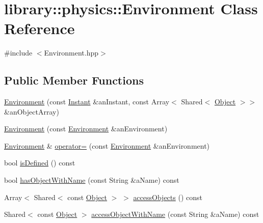\hypertarget{classlibrary_1_1physics_1_1_environment}{}\section{library\+:\+:physics\+:\+:Environment Class Reference}
\label{classlibrary_1_1physics_1_1_environment}


{\ttfamily \#include $<$Environment.\+hpp$>$}

\subsection*{Public Member Functions}
\begin{DoxyCompactItemize}
\item 
\hyperlink{classlibrary_1_1physics_1_1_environment_a51854f130c31eb075ea623e332978495}{Environment} (const \hyperlink{classlibrary_1_1physics_1_1time_1_1_instant}{Instant} \&an\+Instant, const Array$<$ Shared$<$ \hyperlink{classlibrary_1_1physics_1_1env_1_1_object}{Object} $>$$>$ \&an\+Object\+Array)
\item 
\hyperlink{classlibrary_1_1physics_1_1_environment_afb2fe03dcd7061a8ed5e155d7d134ba2}{Environment} (const \hyperlink{classlibrary_1_1physics_1_1_environment}{Environment} \&an\+Environment)
\item 
\hyperlink{classlibrary_1_1physics_1_1_environment}{Environment} \& \hyperlink{classlibrary_1_1physics_1_1_environment_a3410b331642161ad087d76b7d5019a86}{operator=} (const \hyperlink{classlibrary_1_1physics_1_1_environment}{Environment} \&an\+Environment)
\item 
bool \hyperlink{classlibrary_1_1physics_1_1_environment_acbe2e199328ec6a3d2c233dbe8eb6359}{is\+Defined} () const
\item 
bool \hyperlink{classlibrary_1_1physics_1_1_environment_ab88060948d60e3775d3c48047e1565aa}{has\+Object\+With\+Name} (const String \&a\+Name) const
\item 
Array$<$ Shared$<$ const \hyperlink{classlibrary_1_1physics_1_1env_1_1_object}{Object} $>$ $>$ \hyperlink{classlibrary_1_1physics_1_1_environment_a109b7156dadfe992126e01c629146a75}{access\+Objects} () const
\item 
Shared$<$ const \hyperlink{classlibrary_1_1physics_1_1env_1_1_object}{Object} $>$ \hyperlink{classlibrary_1_1physics_1_1_environment_adb18bd17dfbffa181d7e0d868c2647a0}{access\+Object\+With\+Name} (const String \&a\+Name) const
\item 
$$
\end{DoxyCompactItemize}
